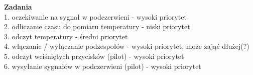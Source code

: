 \documentclass{article}
\begin{document}
\textbf{Zadania}\\
1. oczekiwanie na sygnał w podczerwieni - wysoki priorytet \\
2. odliczanie czasu do pomiaru temperatury - niski priorytet \\
3. odczyt temperatury - średni priorytet \\
4. włączanie / wyłączanie podzespołów - wysoki priorytet, może zająć dłużej(?) \\
5. odczyt wciśniętych przycisków (pilot) - wysoki priorytet \\
6. wysyłanie sygnałów w podczerwieni (pilot) - wysoki priorytet \\
\end{document}
